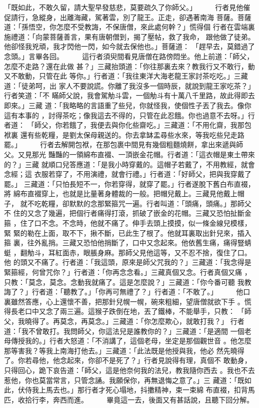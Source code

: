 \begin{pinyinscope}
{「既如此，不敢久留，請大聖早發慈悲，莫要疏久了你師父。」
　　
行者見他催促請行，急縱身，出離海藏，駕著雲，別了龍王。正走，卻遇著南海
菩薩。菩薩道：「孫悟空，你怎麼不受教誨，不保唐僧，來此處何幹？」慌得個
行者在雲端裏施禮道：「向蒙菩薩善言，果有唐朝僧到，揭了壓帖，救了我命，
跟他做了徒弟。他卻怪我兇頑，我才閃他一閃，如今就去保他也。」菩薩道：
「趕早去，莫錯過了念頭。」言畢各回。
　　
這行者須臾間看見唐僧在路傍悶坐。他上前道：「師父，怎麼不走路？還在此做
甚？」三藏抬頭道：「你往那裏去來？教我行又不敢行，動又不敢動，只管在此
等你。」行者道：「我往東洋大海老龍王家討茶吃吃。」三藏道：「徒弟呵，出
家人不要說謊。你離了我沒多一個時辰，就說到龍王家吃茶？」行者笑道：「不
瞞師父說，我會駕觔斗雲，一個觔斗有十萬八千里路，故此得即去即來。」三藏
道：「我略略的言語重了些兒，你就怪我，使個性子丟了我去。像你這有本事的
，討得茶吃；像我這去不得的，只管在此忍餓。你也過意不去呀。」行者道：
「師父，你若餓了，我便去與你化些齋吃。」三藏道：「不用化齋，我那包袱裏
還有些乾糧，是劉太保母親送的。你去拿缽盂尋些水來，等我吃些兒走路罷。」
　　
行者去解開包袱，在那包裹中間見有幾個粗麵燒餅，拿出來遞與師父。又見那光
豔豔的一領綿布直裰、一頂嵌金花帽。行者道：「這衣帽是東土帶來的？」三藏
就順口兒答應道：「是我小時穿戴的。這帽子若戴了，不用教經，就會念經；這
衣服若穿了，不用演禮，就會行禮。」行者道：「好師父，把與我穿戴了罷。」
三藏道：「只怕長短不一，你若穿得，就穿了罷。」行者遂脫下舊白布直裰，將
綿布直裰穿上，也就是比量著身體裁的一般。把帽兒戴上。三藏見他戴上帽子，
就不吃乾糧，卻默默的念那緊箍咒一遍。行者叫道：「頭痛，頭痛。」那師父不
住的又念了幾遍，把個行者痛得打滾，抓破了嵌金的花帽。三藏又恐怕扯斷金箍
，住了口不念。不念時，他就不痛了。伸手去頭上摸摸，似一條金線兒模樣，緊
緊的勒在上面，取不下，揪不斷，已此生了根了。他就耳裏取出針兒來，插入箍
裏，往外亂捎。三藏又恐怕他捎斷了，口中又念起來。他依舊生痛，痛得豎蜻蜓
，翻觔斗，耳紅面赤，眼脹身麻。那師父見他這等，又不忍不捨，復住了口。他
的頭又不痛了。行者道：「我這頭，原來是師父咒我的？」三藏道：「我念得是
緊箍經，何曾咒你？」行者道：「你再念念看。」三藏真個又念。行者真個又痛
，只教：「莫念，莫念。念動我就痛了。這是怎麼說？」三藏道：「你今番可聽
我教誨了？」行者道：「聽教了。」「你再可無禮了？」行者道：「不敢了。」
　　
他口裏雖然答應，心上還懷不善，把那針兒幌一幌，碗來粗細，望唐僧就欲下手
。慌得長老口中又念了兩三遍。這猴子跌倒在地，丟了鐵棒，不能舉手，只教：
「師父，我曉得了。再莫念，再莫念。」三藏道：「你怎麼欺心，就敢打我？」
行者道：「我不曾敢打。我問師父，你這法兒是誰教你的？」三藏道：「是適間
一個老母傳授我的。」行者大怒道：「不消講了，這個老母，坐定是那個觀世音
。他怎麼那等害我？等我上南海打他去。」三藏道：「此法既是他授與我，他必
然先曉得了。你若尋他，他念起來，你卻不是死了？」行者見說得有理，真個不
敢動身，只得回心，跪下哀告道：「師父，這是他奈何我的法兒，教我隨你西去
。我也不去惹他，你也莫當常言，只管念誦。我願保你，再無退悔之意了。」三
藏道：「既如此，伏侍我上馬去也。」那行者才死心塌地，抖擻精神，束一束綿
布直裰，扣背馬匹，收拾行李，奔西而進。
　　
    畢竟這一去，後面又有甚話說，且聽下回分解。




}
\end{pinyinscope}

